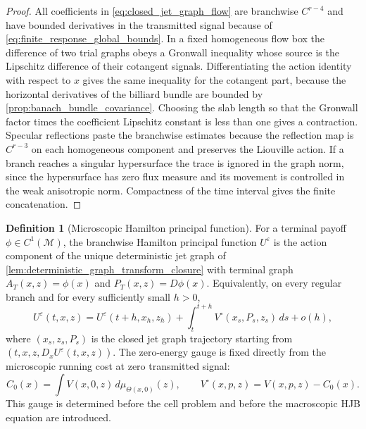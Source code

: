 \documentclass[12pt, letterpaper]{amsart}
\newcommand{\Mcal}{\mathcal{M}}
\theoremstyle{plain}
\theoremstyle{definition}
\newtheorem{definition}[theorem]{Definition}
\theoremstyle{remark}
\begin{document}
\begin{proof}
All coefficients in \eqref{eq:closed_jet_graph_flow} are branchwise $C^{r-4}$
and have bounded derivatives in the transmitted signal because of
\eqref{eq:finite_response_global_bounds}.  In a fixed homogeneous flow box the
difference of two trial graphs obeys a Gronwall inequality whose source is the
Lipschitz difference of their cotangent signals.  Differentiating the action
identity with respect to $x$ gives the same inequality for the cotangent part,
because the horizontal derivatives of the billiard bundle are bounded by
\cref{prop:banach_bundle_covariance}.  Choosing the slab length so that the
Gronwall factor times the coefficient Lipschitz constant is less than one gives
a contraction.  Specular reflections paste the branchwise estimates because the
reflection map is $C^{r-3}$ on each homogeneous component and preserves the
Liouville action.  If a branch reaches a singular hypersurface the trace is
ignored in the graph norm, since the hypersurface has zero flux measure and its
movement is controlled in the weak anisotropic norm.  Compactness of the time
interval gives the finite concatenation.
\end{proof}

\begin{definition}[Microscopic Hamilton principal function]
\label{def:microscopic_principal_function}
For a terminal payoff $\phi\in C^1(\Mcal)$, the branchwise Hamilton principal
function $U^\varepsilon$ is the action component of the unique deterministic jet
graph of \cref{lem:deterministic_graph_transform_closure} with terminal graph
$A_T(x,z)=\phi(x)$ and $P_T(x,z)=D\phi(x)$.  Equivalently, on every regular
branch and for every sufficiently small $h>0$,
\begin{equation}
\label{eq:deterministic_action_identity}
    U^\varepsilon(t,x,z)=U^\varepsilon(t+h,x_h,z_h)
    +\int_t^{t+h} V^\circ(x_s,P_s,z_s)\,ds+o(h),
\end{equation}
where $(x_s,z_s,P_s)$ is the closed jet graph trajectory starting from
$(t,x,z,D_xU^\varepsilon(t,x,z))$.  The zero-energy gauge is fixed directly from
the microscopic running cost at zero transmitted signal:
\begin{equation}
\label{eq:C0_gauge_prelimit}
    C_0(x)=\int V(x,0,z)\,d\mu_{\Theta(x,0)}(z),
    \qquad
    V^\circ(x,p,z)=V(x,p,z)-C_0(x).
\end{equation}
This gauge is determined before the cell problem and before the macroscopic HJB
equation are introduced.
\end{definition}
\end{document}
